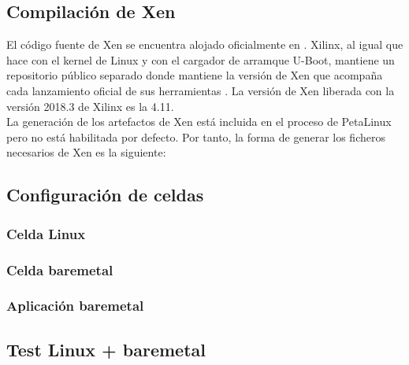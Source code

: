 \subsection{Compilación de Xen}

El código fuente de Xen se encuentra alojado oficialmente en \cite{xen_source}. Xilinx, al igual que hace con el kernel de Linux y con el cargador de arramque U-Boot, mantiene un repositorio público separado donde mantiene la versión de Xen que acompaña cada lanzamiento oficial de sus herramientas \cite{xen_source_xilinx}. La versión de Xen liberada con la versión 2018.3 de Xilinx es la 4.11.\\
La generación de los artefactos de Xen está incluida en el proceso de PetaLinux pero no está habilitada por defecto. Por tanto, la forma de generar los ficheros necesarios de Xen es la siguiente:

\subsection{Configuración de celdas}
\subsubsection{Celda Linux}
\subsubsection{Celda baremetal}
\subsubsection{Aplicación baremetal}

\subsection{Test Linux + baremetal}
